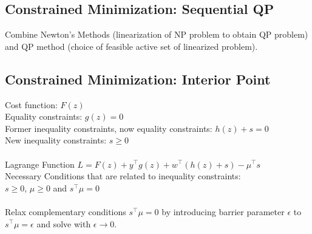 \documentclass[english]{latex4ei/latex4ei_sheet}
\begin{document}
\begin{sectionbox}
\subsection{Constrained Minimization: Sequential QP}
Combine Newton's Methods (linearization of NP problem to obtain QP problem) and QP method (choice of feasible active set of linearized problem).\\

\subsection{Constrained Minimization: Interior Point}
Cost function: $F(z)$\\
Equality constraints: $g(z)=0$\\
Former inequality constraints, now equality constraints: $h(z)+s=0$\\
New inequality constraints: $s\geq 0$\\
\\
Lagrange Function $L=F(z)+y^{\top}g(z)+w^{\top}(h(z)+s)-\mu^{\top}s$\\
Necessary Conditions that are related to inequality constraints:\\
$s \geq 0 $, $\mu \geq 0$ and $s^{\top}\mu=0$\\
\\
Relax complementary conditions $s^{\top}\mu=0$ by introducing barrier parameter $\epsilon$ to $s^{\top}\mu=\epsilon$ and solve with $\epsilon \rightarrow 0$.
\end{sectionbox}
\end{document}
